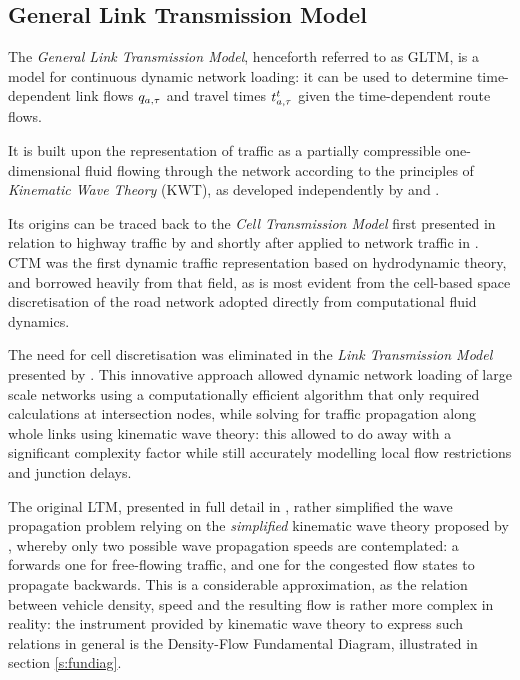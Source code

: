 \subsection{General Link Transmission Model}
The \emph{General Link Transmission Model}, henceforth referred to as GLTM, is a model for continuous dynamic network loading: it can be used to determine time-dependent link flows $q_{a,\tau}$ and travel times $t_{a,\tau}^t$ given the time-dependent route flows.

It is built upon the representation of traffic as a partially compressible one-dimensional fluid flowing through the network according to the principles of \emph{Kinematic Wave Theory} (KWT), as developed independently by \cite{lighthill1955kinematic} and \cite{richards1956shock}.

Its origins can be traced back to the \emph{Cell Transmission Model} first presented in relation to highway traffic by \cite{daganzo1994cell} and shortly after applied to network traffic in \citep{daganzo1995cell}. CTM was the first dynamic traffic representation based on hydrodynamic theory, and borrowed heavily from that field, as is most evident from the cell-based space discretisation of the road network adopted directly from computational fluid dynamics.

The need for cell discretisation was eliminated in the \emph{Link Transmission Model} presented by \cite{yperman2005link}. This innovative approach allowed dynamic network loading of large scale networks using a computationally efficient algorithm that only required calculations at intersection nodes, while solving for traffic propagation along whole links using kinematic wave theory: this allowed to do away with a significant complexity factor while still accurately modelling local flow restrictions and junction delays.

The original LTM, presented in full detail in \cite{yperman2007link}, rather simplified the wave propagation problem relying on the \emph{simplified} kinematic wave theory proposed by \citep{newell1993simplified}, whereby only two possible wave propagation speeds are contemplated: a forwards one for free-flowing traffic, and one for the congested flow states to propagate backwards.
This is a considerable approximation, as the relation between vehicle density, speed and the resulting flow is rather more complex in reality:
the instrument provided by kinematic wave theory to express such relations in general is the Density-Flow Fundamental Diagram, illustrated in section \ref{s:fundiag}.

